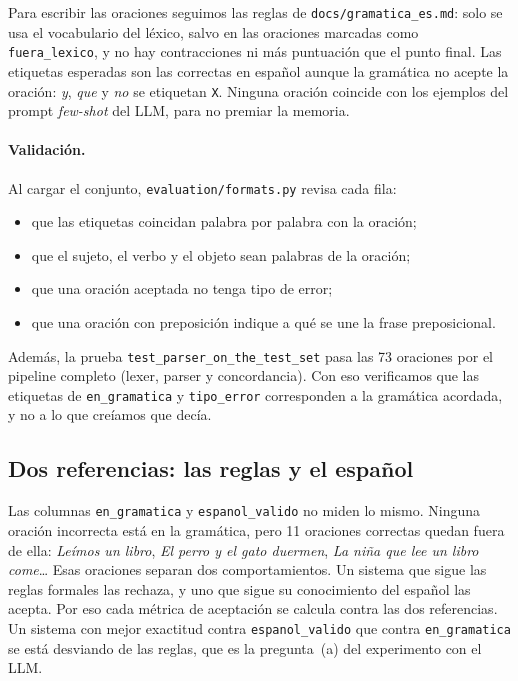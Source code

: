 \begin{table}[h]
  \centering
  \small
  \caption{Fenómenos por nivel. Los 16 fenómenos de la lista acordada aparecen al menos dos veces.}
  \label{tab:fenomenos}
\end{table}

Para escribir las oraciones seguimos las reglas de \texttt{docs/gramatica\_es.md}: solo se
usa el vocabulario del léxico, salvo en las oraciones marcadas como \texttt{fuera\_lexico}, y
no hay contracciones ni más puntuación que el punto final. Las etiquetas esperadas son las
correctas en español aunque la gramática no acepte la oración: \emph{y}, \emph{que} y
\emph{no} se etiquetan \texttt{X}. Ninguna oración coincide con los ejemplos del prompt
\emph{few-shot} del LLM, para no premiar la memoria.

\paragraph{Validación.} Al cargar el conjunto, \texttt{evaluation/formats.py} revisa cada fila:
\begin{itemize}
  \item que las etiquetas coincidan palabra por palabra con la oración;
  \item que el sujeto, el verbo y el objeto sean palabras de la oración;
  \item que una oración aceptada no tenga tipo de error;
  \item que una oración con preposición indique a qué se une la frase preposicional.
\end{itemize}
Además, la prueba \texttt{test\_parser\_on\_the\_test\_set} pasa las 73 oraciones por el pipeline
completo (lexer, parser y concordancia). Con eso verificamos que las etiquetas de
\texttt{en\_gramatica} y \texttt{tipo\_error} corresponden a la gramática acordada, y no a lo que
creíamos que decía.

\subsection{Dos referencias: las reglas y el español}

Las columnas \texttt{en\_gramatica} y \texttt{espanol\_valido} no miden lo mismo. Ninguna oración
incorrecta está en la gramática, pero 11 oraciones correctas quedan fuera de ella: \emph{Leímos
un libro}, \emph{El perro y el gato duermen}, \emph{La niña que lee un libro come}… Esas
oraciones separan dos comportamientos. Un sistema que sigue las reglas formales las rechaza, y
uno que sigue su conocimiento del español las acepta. Por eso cada métrica de aceptación se
calcula contra las dos referencias. Un sistema con mejor exactitud contra
\texttt{espanol\_valido} que contra \texttt{en\_gramatica} se está desviando de las reglas, que
es la pregunta~(a) del experimento con el LLM.

